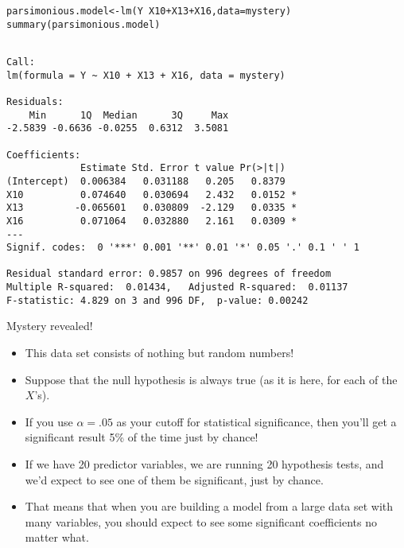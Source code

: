 \documentclass{beamer}\usepackage[]{graphicx}\usepackage[]{color}
\makeatletter
\newcommand{\hlopt}[1]{\textcolor[rgb]{1,0.894,0.769}{#1}}%
\newcommand{\hlstd}[1]{\textcolor[rgb]{1,0.894,0.769}{#1}}%
\newcommand{\hlkwb}[1]{\textcolor[rgb]{0.804,0.776,0.451}{#1}}%
\newcommand{\hlkwc}[1]{\textcolor[rgb]{0.78,0.941,0.545}{#1}}%
\newcommand{\hlkwd}[1]{\textcolor[rgb]{1,0.78,0.769}{#1}}%
\newenvironment{kframe}{%
 \def\at@end@of@kframe{}%
 \ifinner\ifhmode%
  \def\at@end@of@kframe{\end{minipage}}%
  \begin{minipage}{\columnwidth}%
 \fi\fi%
 \def\FrameCommand##1{\hskip\@totalleftmargin \hskip-\fboxsep
 \colorbox{shadecolor}{##1}\hskip-\fboxsep
     \hskip-\linewidth \hskip-\@totalleftmargin \hskip\columnwidth}%
 \MakeFramed {\advance\hsize-\width
   \@totalleftmargin\z@ \linewidth\hsize
   \@setminipage}}%
 {\par\unskip\endMakeFramed%
 \at@end@of@kframe}
\newenvironment{knitrout}{}{} %
\makeatother
\begin{document}
\begin{darkframes}
\begin{frame}[fragile]
\begin{knitrout}
\begin{kframe}
\begin{verbatim}
\end{verbatim}
\end{kframe}
\end{knitrout}
    \end{frame}

    \begin{frame}[fragile]
      \fontvsm
\begin{knitrout}
\color{fgcolor}\begin{kframe}
\begin{alltt}
\hlstd{parsimonious.model} \hlkwb{<-} \hlkwd{lm}\hlstd{(Y} \hlopt{~} \hlstd{X10} \hlopt{+} \hlstd{X13} \hlopt{+} \hlstd{X16,} \hlkwc{data}\hlstd{=mystery)}
\hlkwd{summary}\hlstd{(parsimonious.model)}
\end{alltt}
\begin{verbatim}

Call:
lm(formula = Y ~ X10 + X13 + X16, data = mystery)

Residuals:
    Min      1Q  Median      3Q     Max 
-2.5839 -0.6636 -0.0255  0.6312  3.5081 

Coefficients:
             Estimate Std. Error t value Pr(>|t|)  
(Intercept)  0.006384   0.031188   0.205   0.8379  
X10          0.074640   0.030694   2.432   0.0152 *
X13         -0.065601   0.030809  -2.129   0.0335 *
X16          0.071064   0.032880   2.161   0.0309 *
---
Signif. codes:  0 '***' 0.001 '**' 0.01 '*' 0.05 '.' 0.1 ' ' 1

Residual standard error: 0.9857 on 996 degrees of freedom
Multiple R-squared:  0.01434,	Adjusted R-squared:  0.01137 
F-statistic: 4.829 on 3 and 996 DF,  p-value: 0.00242
\end{verbatim}
\end{kframe}
\end{knitrout}
    \end{frame}

    \begin{frame}{Mystery revealed!}
      \begin{itemize}[<+->]
        \item This data set consists of nothing but random numbers!
        \item Suppose that the null hypothesis is always true (as it is here, for each of the $X$'s).
        \item If you use $\alpha=.05$ as your cutoff for statistical significance, then you'll get a significant result 5\% of the time just by chance!
        \item If we have 20 predictor variables, we are running 20 hypothesis tests, and we'd \alert{expect} to see one of them be significant, just by chance.
        \item That means that when you are building a model from a large data set with many variables, you should expect to see some significant coefficients no matter what.
      \end{itemize}
    \end{frame}


\end{darkframes}
\end{document}
